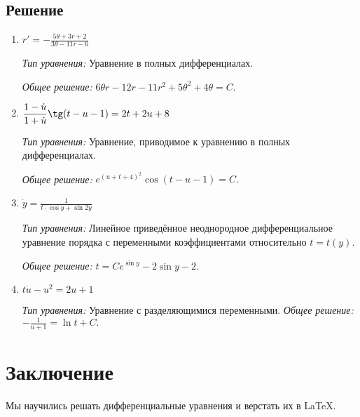 \documentclass[14pt, a4paper, titlepage, fleqn]{extarticle}
\newcommand{\rnc}[1]
    {\MakeUppercase{\romannumeral #1}}
\begin{document}
        \subsection{Решение}
            \begin{enumerate}
                \item \( 
                        \displaystyle 
                        r' = -\frac{5\theta + 3r + 2}{3\theta -11r-6}
                    \)

                    \textit{Тип уравнения:}
                        Уравнение в полных дифференциалах.

                    \textit{Общее решение:}
                        \(
                            \displaystyle
                            6 \theta r-12r-11r^2+5\theta^2+4\theta=C.
                        \)

                \item  \(
                        \displaystyle
                        \frac{1-\dot{u}}{1+\dot{u}} \tg (t-u-1) = 2t+2u+8 %
                    \)

                    \textit{Тип уравнения:}
                        Уравнение, приводимое к уравнению в полных дифференциалах.

                    \textit{Общее решение:}
                        \(
                            \displaystyle
                            e^{(u+t+4)^2} \cos(t-u-1) = C.
                        \)

                \pagebreak

                \item  \(
                        \displaystyle
                        \dot{y} = \frac{1}{t \cdot \cos{y} + \sin{2y}}
                    \)

                    \textit{Тип уравнения:}
                        Линейное приведённое неоднородное дифференциальное уравнение 
                        \rnc{1} порядка с переменными коэффициентами относительно
                        \(t = t(y)\).

                    \textit{Общее решение:}
                        \( t = C e^{\sin{y}} - 2 \sin{y}-2. \)
                
                \item \( t\dot{u} - u^2=2u+1 \)

                \textit{Тип уравнения:} Уравнение с разделяющимися переменными.
                \textit{Общее решение:}
                    \(
                        \displaystyle
                        -\frac{1}{u+1}=\ln{t}+C.
                    \)
            \end{enumerate}

    \pagebreak

    \section{Заключение}
        Мы научились решать дифференциальные 
        уравнения и верстать их в \LaTeX.
\end{document}
